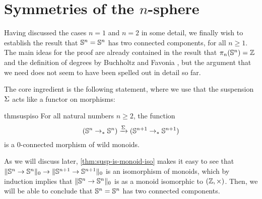 \documentclass[english,a4paper]{lmcs}
\begin{document}
\section{Symmetries of the \texorpdfstring{$n$}{n}-sphere}
\label{sec:higher-sphere}



Having discussed the cases $n = 1$ and $n = 2$ in some detail, we finally wish to establish the result that ${\mathbb S^{n}} = {\mathbb S^{n}}$ has two connected components, for all $n \geq 1$.
The main ideas for the proof are already contained in the result that $\pi_n({\mathbb S^{n}}) = \mathbb{Z}$ \cite{licataBrunerie_s1again} and the definition of degrees by Buchholtz and Favonia \cite{Buchholtz2018CellularCI}, but the argument that we need does not seem to have been spelled out in detail so far.

The core ingredient is the following statement,
where we use that the suspension $\operatorname{\Sigma}$ acts like a functor on morphisms:
\begin{restatable}{thm}{suspiso}
    \label{thm:susp-is-monoid-iso}
    For all natural numbers $n \geq 2$, the function
    \begin{equation} \label{eq:susp-monoid-morphism}
    ({\mathbb S^{n}} \to_* {\mathbb S^{n}}) \xrightarrow{\operatorname{\Sigma}} ({\mathbb S^{n+1}} \to_* {\mathbb S^{n+1}})
    \end{equation}
    is a $0$-connected morphism of wild monoids.
\end{restatable}

As we will discuss later, \cref{thm:susp-is-monoid-iso} makes it easy to see
that $\lVert{\mathbb S^{n}} \to {\mathbb S^{n}}\rVert_0 \to \lVert{\mathbb S^{n+1}} \to {\mathbb S^{n+1}}\rVert_0$ is
an isomorphism of monoids, which by induction implies that $\lVert{\mathbb S^{n}}
\to {\mathbb S^{n}}\rVert_0$ is as a monoid isomorphic to $(\mathbb{Z}, \times)$. Then, we will be able
to conclude that ${\mathbb S^{n}} = {\mathbb S^{n}}$ has two connected components.
\end{document}
